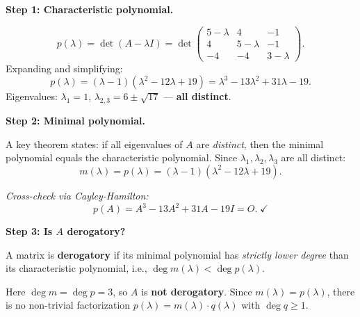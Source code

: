 \documentclass[12pt,a3paper]{article}
\begin{document}
\begin{tcolorbox}[enhanced,breakable,
  colback=cE!4,colframe=cE,boxrule=0.8pt,arc=5pt,
  title={\textbf{Answer --- Characteristic \& Minimal Polynomial; Derogatory Check}},
  fonttitle=\bfseries\color{white},colbacktitle=cE]

\textbf{Step 1: Characteristic polynomial.}

\[
p(\lambda)=\det(A-\lambda I)=\det\begin{pmatrix}5-\lambda&4&-1\\4&5-\lambda&-1\\-4&-4&3-\lambda\end{pmatrix}.
\]
Expanding and simplifying:
\[
\boxed{p(\lambda)=(\lambda-1)(\lambda^2-12\lambda+19)=\lambda^3-13\lambda^2+31\lambda-19.}
\]
Eigenvalues: $\lambda_1=1$, $\lambda_{2,3}=6\pm\sqrt{17}$ --- \textbf{all distinct}.

\medskip
\textbf{Step 2: Minimal polynomial.}

A key theorem states: if all eigenvalues of $A$ are \emph{distinct}, then the minimal polynomial equals the characteristic polynomial. Since $\lambda_1, \lambda_2, \lambda_3$ are all distinct:
\[
\boxed{m(\lambda)=p(\lambda)=(\lambda-1)(\lambda^2-12\lambda+19).}
\]

\textit{Cross-check via Cayley-Hamilton:}
\[
p(A)=A^3-13A^2+31A-19I=O.\;\checkmark
\]

\medskip
\textbf{Step 3: Is $A$ derogatory?}

A matrix is \textbf{derogatory} if its minimal polynomial has \emph{strictly lower degree} than its characteristic polynomial, i.e., $\deg m(\lambda)<\deg p(\lambda)$.

Here $\deg m = \deg p = 3$, so $A$ is \textbf{not derogatory}. Since $m(\lambda)=p(\lambda)$, there is no non-trivial factorization $p(\lambda)=m(\lambda)\cdot q(\lambda)$ with $\deg q\geq 1$.

\end{tcolorbox}
\end{document}
